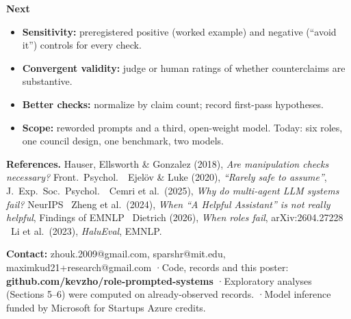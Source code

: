 \documentclass{article}
\newcommand{\smalltext}{\fontsize{24}{32}\selectfont}
\newcommand{\tinytext}{\fontsize{18}{24}\selectfont}
\begin{document}
\begin{minipage}[t]{12.6in}
\vspace{0.4em}
{\fontsize{30}{38}\selectfont\bfseries Next\par}
{\smalltext
\begin{itemize}
\item \textbf{Sensitivity:} preregistered positive (worked example) and negative (``avoid it'') controls for every check.
\item \textbf{Convergent validity:} judge or human ratings of whether counterclaims are substantive.
\item \textbf{Better checks:} normalize by claim count; record first-pass hypotheses.
\item \textbf{Scope:} reworded prompts and a third, open-weight model. Today: six roles, one council design, one benchmark, two models.
\end{itemize}}

\vspace{0.5em}
{\tinytext\color{secondary}\textbf{References.}
Hauser, Ellsworth \& Gonzalez (2018), \emph{Are manipulation checks necessary?} Front.\ Psychol.\ \textbullet\
Ejel\"ov \& Luke (2020), \emph{``Rarely safe to assume''}, J.\ Exp.\ Soc.\ Psychol.\ \textbullet\
Cemri et al.\ (2025), \emph{Why do multi-agent LLM systems fail?} NeurIPS \textbullet\
Zheng et al.\ (2024), \emph{When ``A Helpful Assistant'' is not really helpful}, Findings of EMNLP \textbullet\
Dietrich (2026), \emph{When roles fail}, arXiv:2604.27228 \textbullet\
Li et al.\ (2023), \emph{HaluEval}, EMNLP.\par}
\end{minipage}

\vfill
{\tinytext\color{secondary}
\textbf{Contact:} zhouk.2009@gmail.com, sparshr@mit.edu, maximkud21+research@gmail.com \quad·\quad Code, records and this poster: \textbf{github.com/kevzho/role-prompted-systems}
\quad·\quad Exploratory analyses (Sections 5--6) were computed on already-observed records.
\quad·\quad Model inference funded by Microsoft for Startups Azure credits.\par}
\end{document}
